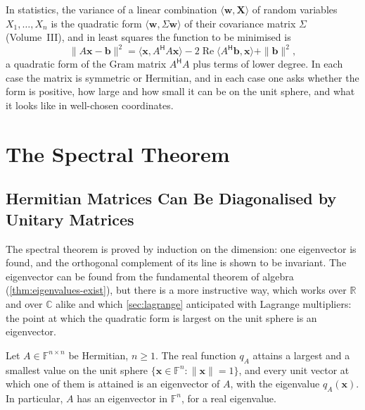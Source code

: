 In statistics, the variance of a linear combination $\langle\mathbf w,\mathbf X\rangle$ of random variables $X_1,\ldots,X_n$ is the quadratic form $\langle\mathbf w,\Sigma\mathbf w\rangle$ of their covariance matrix $\Sigma$ (Volume~III), and in least squares the function to be minimised is
\[
\|A\mathbf x-\mathbf b\|^2=\langle\mathbf x,A^{\mathsf H}A\mathbf x\rangle-2\operatorname{Re}\langle A^{\mathsf H}\mathbf b,\mathbf x\rangle+\|\mathbf b\|^2 ,
\]
a quadratic form of the Gram matrix $A^{\mathsf H}A$ plus terms of lower degree. In each case the matrix is symmetric or Hermitian, and in each case one asks whether the form is positive, how large and how small it can be on the unit sphere, and what it looks like in well-chosen coordinates.

\section{The Spectral Theorem}
\label{sec:spectral-theorem}

\subsection{Hermitian Matrices Can Be Diagonalised by Unitary Matrices}

The spectral theorem is proved by induction on the dimension: one eigenvector is found, and the orthogonal complement of its line is shown to be invariant. The eigenvector can be found from the fundamental theorem of algebra (\cref{thm:eigenvalues-exist}), but there is a more instructive way, which works over $\mathbb R$ and over $\mathbb C$ alike and which \cref{sec:lagrange} anticipated with Lagrange multipliers: the point at which the quadratic form is largest on the unit sphere is an eigenvector.

\begin{lemma}
\label{lem:variational-eigenvector}
Let $A\in\mathbb F^{n\times n}$ be Hermitian, $n\ge1$. The real function $q_A$ attains a largest and a smallest value on the unit sphere $\{\mathbf x\in\mathbb F^n:\|\mathbf x\|=1\}$, and every unit vector at which one of them is attained is an eigenvector of $A$, with the eigenvalue $q_A(\mathbf x)$. In particular, $A$ has an eigenvector in $\mathbb F^n$, for a real eigenvalue.
\end{lemma}

